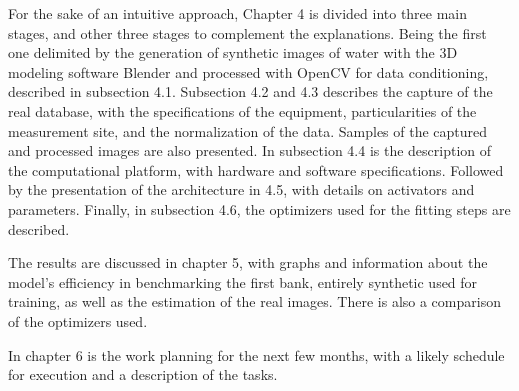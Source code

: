     For the sake of an intuitive approach, Chapter 4 is divided into three main stages, and other three stages to complement the explanations. Being the first one delimited by the generation of synthetic images of water with the 3D modeling software Blender and processed with OpenCV for data conditioning, described in subsection 4.1.
    Subsection 4.2 and 4.3 describes the capture of the real database, with the specifications of the equipment, particularities of the measurement site, and the normalization of the data. Samples of the captured and processed images are also presented. 
    In subsection 4.4 is the description of the computational platform, with hardware and software specifications. Followed by the presentation of the architecture in 4.5, with details on activators and parameters. Finally, in subsection 4.6, the optimizers used for the fitting steps are described.
    
    The results are discussed in chapter 5, with graphs and information about the model's efficiency in benchmarking the first bank, entirely synthetic used for training, as well as the estimation of the real images. There is also a comparison of the optimizers used.
    
    In chapter 6 is the work planning for the next few months, with a likely schedule for execution and a description of the tasks.